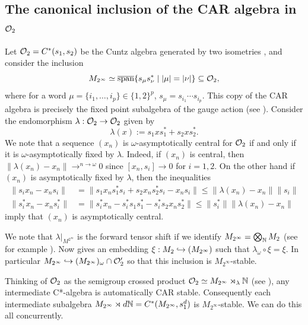 \documentclass[12pt]{amsart}
\begin{document}
  \subsection{The canonical inclusion of the CAR algebra in $\mathcal{O}_2$}\label{ssection:dse-car-in-O2}
    \begin{example}
      Let $\mathcal{O}_2 = C^*(s_1,s_2)$ be the Cuntz algebra generated by two isometries \cite{Cuntz77}, and consider the inclusion
\begin{equation}
      M_{2^{\infty}} \simeq \overline{\text{span}}\{s_\mu s_\nu^* \mid |\mu| = |\nu|\} \subseteq \mathcal{O}_2,
\end{equation}
      where for a word $\mu = \{i_1,\dots,i_p\} \in \{1,2\}^p$, $s_\mu = s_{i_1}\cdots s_{i_p}$. This copy of the CAR algebra is precisely the fixed point subalgebra of the gauge action (see \cite{RaeburnBook}). Consider the endomorphism $\lambda: \mathcal{O}_2 \to \mathcal{O}_2$ given by
\begin{equation}
      \lambda(x) := s_1xs_1^* + s_2xs_2^*.
\end{equation}
      We note that a sequence $(x_n)$ is $\omega$-asymptotically central for $\mathcal{O}_2$ if and only if it is $\omega$-asymptotically fixed by $\lambda$. Indeed, if $(x_n)$ is central, then $\|\lambda(x_n) - x_n\| \to^{n \to \omega} 0$ since $[x_n,s_i] \to 0$ for $i=1,2$. On the other hand if $(x_n)$ is asymptotically fixed by $\lambda$, then the inequalities
 \begin{equation}
         \begin{split}
        \|s_ix_n - x_ns_i\| &= \|s_1x_ns_1^*s_i + s_2x_ns_2^*s_i - x_ns_i\| \leq \|\lambda(x_n) - x_n\|\|s_i\| \\
        \|s_i^*x_n - x_ns_i^*\| &= \|s_i^*x_n - s_i^*s_1s_1^* - s_i^*s_2x_ns_2^*\| \leq \|s_i^*\|\|\lambda(x_n) - x_n\|
        \end{split}
 \end{equation}
        imply that $(x_n)$ is asymptotically central. 

        We note that $\lambda|_{M^{2^{\infty}}}$ is the forward tensor shift if we identify $M_{2^{\infty}} = \bigotimes_{\mathbb{N}} M_2$ (see for example \cite[Section V.4]{DavidsonBook1}). Now \cite{BSKR93} gives an embedding $\xi: M_2 \hookrightarrow (M_{2^{\infty}})$ such that $\lambda_\omega \circ \xi = \xi$. In particular $M_{2^{\infty}} \hookrightarrow (M_{2^{\infty}})_{\omega} \cap \mathcal{O}_2'$ so that this inclusion is $M_{2^{\infty}}$-stable. 
    \end{example}

    Thinking of $\mathcal{O}_2$ as the semigroup crossed product $\mathcal{O}_2 \simeq M_{2^{\infty}} \rtimes_\lambda \mathbb{N}$ (see \cite{Rordam95,Rordam21}), any intermediate C*-algebra is automatically CAR stable. Consequently each intermediate subalgebra $M_{2^{\infty}} \rtimes d\mathbb{N} = C^*(M_{2^{\infty}},s_1^d)$ is $M_{2^{\infty}}$-stable. We can do this all concurrently. 
\end{document}
